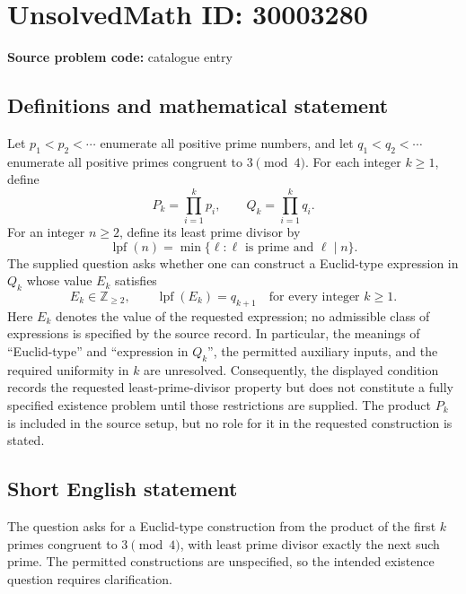 \documentclass[11pt]{article}
\newcommand{\Z}{\mathbb{Z}}
\begin{document}
\section*{UnsolvedMath ID: 30003280}
\textbf{Source problem code:} catalogue entry
\subsection{Definitions and mathematical statement}
Let \(p_1<p_2<\cdots\) enumerate all positive prime numbers, and let \(q_1<q_2<\cdots\) enumerate all positive primes congruent to \(3\pmod 4\). For each integer \(k\geq 1\), define
\[
P_k=\prod_{i=1}^{k}p_i,\qquad Q_k=\prod_{i=1}^{k}q_i.
\]
For an integer \(n\geq 2\), define its least prime divisor by
\[
\operatorname{lpf}(n)=\min\{\ell:\ell\text{ is prime and }\ell\mid n\}.
\]
The supplied question asks whether one can construct a Euclid-type expression in \(Q_k\) whose value \(E_k\) satisfies
\[
E_k\in\Z_{\geq 2},\qquad \operatorname{lpf}(E_k)=q_{k+1}
\quad\text{for every integer }k\geq 1.
\]
Here \(E_k\) denotes the value of the requested expression; no admissible class of expressions is specified by the source record. In particular, the meanings of ``Euclid-type'' and ``expression in \(Q_k\)'', the permitted auxiliary inputs, and the required uniformity in \(k\) are unresolved. Consequently, the displayed condition records the requested least-prime-divisor property but does not constitute a fully specified existence problem until those restrictions are supplied. The product \(P_k\) is included in the source setup, but no role for it in the requested construction is stated.
\subsection{Short English statement}
The question asks for a Euclid-type construction from the product of the first \(k\) primes congruent to \(3\pmod 4\), with least prime divisor exactly the next such prime. The permitted constructions are unspecified, so the intended existence question requires clarification.
\end{document}
